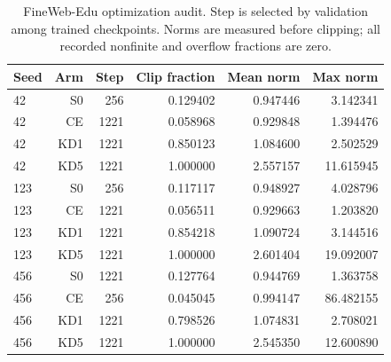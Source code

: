 \begingroup\small
\setlength{\tabcolsep}{5pt}
\begin{table}[htbp]\centering
\begin{tabular}{lrrrrr}
\toprule
Seed & Arm & Step & Clip fraction & Mean norm & Max norm \\
\midrule
42 & S0 & 256 & 0.129402 & 0.947446 & 3.142341 \\
42 & CE & 1221 & 0.058968 & 0.929848 & 1.394476 \\
42 & KD1 & 1221 & 0.850123 & 1.084600 & 2.502529 \\
42 & KD5 & 1221 & 1.000000 & 2.557157 & 11.615945 \\
123 & S0 & 256 & 0.117117 & 0.948927 & 4.028796 \\
123 & CE & 1221 & 0.056511 & 0.929663 & 1.203820 \\
123 & KD1 & 1221 & 0.854218 & 1.090724 & 3.144516 \\
123 & KD5 & 1221 & 1.000000 & 2.601404 & 19.092007 \\
456 & S0 & 1221 & 0.127764 & 0.944769 & 1.363758 \\
456 & CE & 256 & 0.045045 & 0.994147 & 86.482155 \\
456 & KD1 & 1221 & 0.798526 & 1.074831 & 2.708021 \\
456 & KD5 & 1221 & 1.000000 & 2.545350 & 12.600890 \\
\bottomrule
\end{tabular}
\caption{FineWeb-Edu optimization audit. Step is selected by validation among trained checkpoints. Norms are measured before clipping; all recorded nonfinite and overflow fractions are zero.}\label{tab:modern_optimization}
\end{table}
\endgroup
